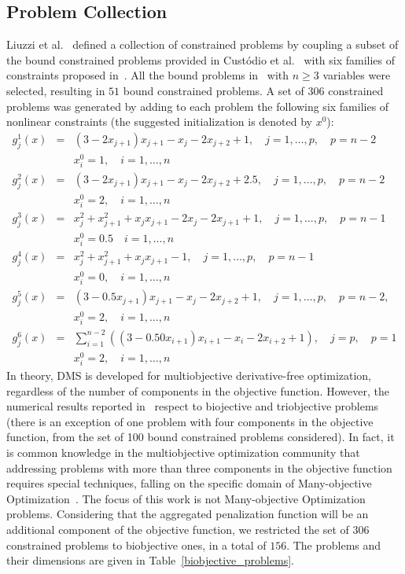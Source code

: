 \documentclass[12pt]{article}
\begin{document}
\subsection{Problem Collection}
Liuzzi et al.~\cite{liuzzi2016} defined a collection of
constrained problems by coupling a subset of the bound constrained
problems provided in Cust\'odio et al.~\cite{custodio2011} with
six families of constraints proposed in~\cite{karmitsa}. All the
bound problems in~\cite{custodio2011} with $n\geq 3$ variables
were selected, resulting in $51$ bound constrained problems. A set
of $306$ constrained problems was generated by adding to each
problem the following six families of nonlinear constraints (the
suggested initialization is denoted by $x^0$):
\begin{eqnarray*}
g_j^1(x) &=& (3-2x_{j+1})x_{j+1}-x_j-2x_{j+2}+1,\quad j=1,\ldots,p,\quad p=n-2\\
& & x^0_i=1,\quad i=1,\ldots,n\nonumber\\
g_j^2(x) &=& (3-2x_{j+1})x_{j+1}-x_j-2x_{j+2}+2.5,\quad j=1,\ldots,p,\quad p=n-2\\
& & x^0_i=2,\quad i=1,\ldots,n\nonumber\\
g_j^3(x) &=& x_j^2+x_{j+1}^2+x_j x_{j+1}-2x_j-2x_{j+1}+1,\quad j=1,\ldots,p,\quad p=n-1\\
& & x^0_i=0.5\quad i=1,\ldots,n\nonumber\\
g_j^4(x) &=& x_j^2+x_{j+1}^2+x_j x_{j+1}-1,\quad j=1,\ldots,p,\quad p=n-1\\
& & x^0_i=0,\quad i=1,\ldots,n\nonumber\\
g_j^5(x) &=& (3-0.5x_{j+1})x_{j+1}-x_j-2x_{j+2}+1,\quad j=1,\ldots,p,\quad p=n-2,\\
& & x^0_i=2,\quad i=1,\ldots,n\nonumber\\
g_j^6(x) &=& \displaystyle \sum_{i=1}^{n-2} ((3-0.50x_{i+1})x_{i+1}-x_i-2x_{i+2}+1),\quad j=p,\quad p=1\\
& & x^0_i=2,\quad i=1,\ldots,n\nonumber
\end{eqnarray*}
In theory, DMS is developed for multiobjective derivative-free
optimization, regardless of the number of components in the
objective function. However, the numerical results reported
in~\cite{custodio2011} respect to biojective and triobjective
problems (there is an exception of one problem with four
components in the objective function, from the set of 100 bound
constrained problems considered). In fact, it is common knowledge
in the multiobjective optimization community that addressing
problems with more than three components in the objective function
requires special techniques, falling on the specific domain of
Many-objective Optimization~\cite{emmerich2018}. The focus of this
work is not Many-objective Optimization problems. Considering that
the aggregated penalization function will be an additional
component of the objective function, we restricted the set of
$306$ constrained problems to biobjective ones, in a total of
$156$. The problems and their dimensions are given in
Table~\ref{biobjective_problems}.
\end{document}
